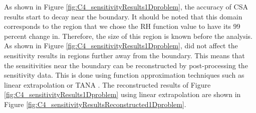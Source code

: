 As shown in Figure \ref{fig:C4_sensitivityResults1Dproblem}, the accuracy of CSA results start to decay near the boundary. It should be noted that this domain corresponds to the region that we chose the RH function value to have its 99 percent change in. Therefore, the size of this region is known before the analysis. As shown in Figure \ref{fig:C4_sensitivityResults1Dproblem}, did not affect the sensitivity results in regions further away from the boundary. This means that the sensitivities near the boundary can be reconstructed by post-processing the sensitivity data. This is done using function approximation techniques such as linear extrapolation or TANA \cite{wang1995improved}. The reconstructed results of Figure \ref{fig:C4_sensitivityResults1Dproblem} using linear extrapolation are shown in Figure \ref{fig:C4_sensitivityResultsReconstructed1Dproblem}.

